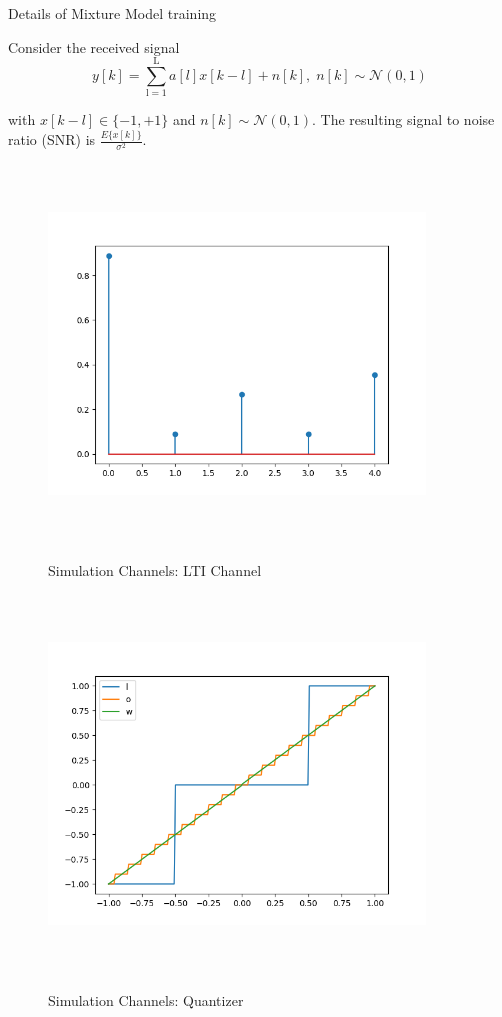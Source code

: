 \documentclass[12pt,a4paper]{report}
\begin{document}
Details of Mixture Model training


Consider the received signal 
\begin{equation}
y[k] = \sum_{\mathrm{l=1}}^{\mathrm{L}} a[l]x[k-l] + n[k], \; n[k]  \sim \mathcal{N}(0,1)
\end{equation}

with $x[k-l] \in \{ -1, +1\}$ and $n[k]  \sim \mathcal{N}(0,1)$.  
The resulting signal to noise ratio (SNR) is 
$\frac{E\{x[k]\}}{\sigma^2}$.


\begin{figure}[H]
	  \caption{Simulation Channels: LTI Channel}
	\includegraphics[width=10cm,height = 10cm]{system_model/lti_channel}
	  \label{fig:LTI Channel}
\end{figure}
\begin{figure}[H]
	  \caption{Simulation Channels: Quantizer}
	\includegraphics[width=10cm,height = 10cm]{system_model/quantizer}
	  \label{fig:Quantized Channel}
\end{figure}
\end{document}
